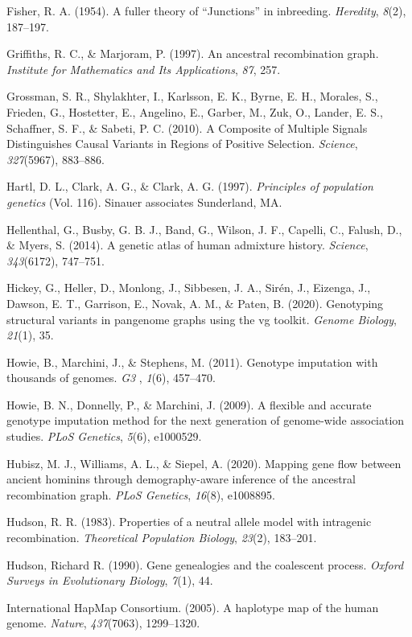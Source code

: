 \documentclass[twocolumn]{bmcart}%
\begin{document}
\begin{backmatter}
\begin{hangparas}{1em}{1}
Fisher, R. A. (1954). A fuller theory of ``Junctions'' in inbreeding.
\emph{Heredity}, \emph{8}(2), 187--197.

Griffiths, R. C., \& Marjoram, P. (1997). An ancestral recombination
graph. \emph{Institute for Mathematics and Its Applications}, \emph{87},
257.

Grossman, S. R., Shylakhter, I., Karlsson, E. K., Byrne, E. H., Morales,
S., Frieden, G., Hostetter, E., Angelino, E., Garber, M., Zuk, O.,
Lander, E. S., Schaffner, S. F., \& Sabeti, P. C. (2010). A Composite of
Multiple Signals Distinguishes Causal Variants in Regions of Positive
Selection. \emph{Science}, \emph{327}(5967), 883--886.

Hartl, D. L., Clark, A. G., \& Clark, A. G. (1997). \emph{Principles of
population genetics} (Vol. 116). Sinauer associates Sunderland, MA.

Hellenthal, G., Busby, G. B. J., Band, G., Wilson, J. F., Capelli, C.,
Falush, D., \& Myers, S. (2014). A genetic atlas of human admixture
history. \emph{Science}, \emph{343}(6172), 747--751.

Hickey, G., Heller, D., Monlong, J., Sibbesen, J. A., Sirén, J.,
Eizenga, J., Dawson, E. T., Garrison, E., Novak, A. M., \& Paten, B.
(2020). Genotyping structural variants in pangenome graphs using the vg
toolkit. \emph{Genome Biology}, \emph{21}(1), 35.

Howie, B., Marchini, J., \& Stephens, M. (2011). Genotype imputation
with thousands of genomes. \emph{G3} , \emph{1}(6), 457--470.

Howie, B. N., Donnelly, P., \& Marchini, J. (2009). A flexible and
accurate genotype imputation method for the next generation of
genome-wide association studies. \emph{PLoS Genetics}, \emph{5}(6),
e1000529.

Hubisz, M. J., Williams, A. L., \& Siepel, A. (2020). Mapping gene flow
between ancient hominins through demography-aware inference of the
ancestral recombination graph. \emph{PLoS Genetics}, \emph{16}(8),
e1008895.

Hudson, R. R. (1983). Properties of a neutral allele model with
intragenic recombination. \emph{Theoretical Population Biology},
\emph{23}(2), 183--201.

Hudson, Richard R. (1990). Gene genealogies and the coalescent process.
\emph{Oxford Surveys in Evolutionary Biology}, \emph{7}(1), 44.

International HapMap Consortium. (2005). A haplotype map of the human
genome. \emph{Nature}, \emph{437}(7063), 1299--1320.


\end{hangparas}
\end{backmatter}
\end{document}
